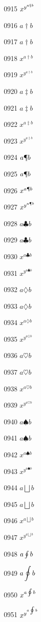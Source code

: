 \documentclass{article}
\begin{document}
0915 $x^{y^{a\mathsection b}}$\par
0916 $a\dagger b$\par
0917 $\displaystyle a\dagger b$\par
0918 $x^{a\dagger b}$\par
0919 $x^{y^{a\dagger b}}$\par
0920 $a\ddagger b$\par
0921 $\displaystyle a\ddagger b$\par
0922 $x^{a\ddagger b}$\par
0923 $x^{y^{a\ddagger b}}$\par
0924 $a\mathparagraph b$\par
0925 $\displaystyle a\mathparagraph b$\par
0926 $x^{a\mathparagraph b}$\par
0927 $x^{y^{a\mathparagraph b}}$\par
0928 $a\clubsuit b$\par
0929 $\displaystyle a\clubsuit b$\par
0930 $x^{a\clubsuit b}$\par
0931 $x^{y^{a\clubsuit b}}$\par
0932 $a\diamondsuit b$\par
0933 $\displaystyle a\diamondsuit b$\par
0934 $x^{a\diamondsuit b}$\par
0935 $x^{y^{a\diamondsuit b}}$\par
0936 $a\heartsuit b$\par
0937 $\displaystyle a\heartsuit b$\par
0938 $x^{a\heartsuit b}$\par
0939 $x^{y^{a\heartsuit b}}$\par
0940 $a\spadesuit b$\par
0941 $\displaystyle a\spadesuit b$\par
0942 $x^{a\spadesuit b}$\par
0943 $x^{y^{a\spadesuit b}}$\par
0944 $a\bigsqcup b$\par
0945 $\displaystyle a\bigsqcup b$\par
0946 $x^{a\bigsqcup b}$\par
0947 $x^{y^{a\bigsqcup b}}$\par
0948 $a\ointop b$\par
0949 $\displaystyle a\ointop b$\par
0950 $x^{a\ointop b}$\par
0951 $x^{y^{a\ointop b}}$\par
\end{document}
